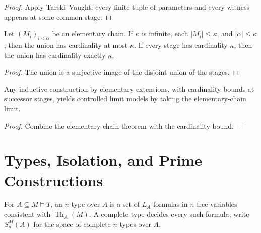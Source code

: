 \begin{proof}
Apply Tarski--Vaught: every finite tuple of parameters and every witness
appears at some common stage.
\end{proof}

\begin{lemma}
\label{lem:elementary-chain-cardinality}
\leanok
{}
Let \((M_i)_{i<\alpha}\) be an elementary chain.  If \(\kappa\) is
infinite, each \(|M_i|\leq\kappa\), and \(|\alpha|\leq\kappa\), then the
union has cardinality at most \(\kappa\).  If every stage has cardinality
\(\kappa\), then the union has cardinality exactly \(\kappa\).
\end{lemma}

\begin{proof}
The union is a surjective image of the disjoint union of the stages.
\end{proof}

\begin{theorem}
\label{thm:loewenheim-skolem-constructions}
\leanok
{}
Any inductive construction by elementary extensions, with cardinality
bounds at successor stages, yields controlled limit models by taking the
elementary-chain limit.
\end{theorem}

\begin{proof}
\leanok
{}
Combine the elementary-chain theorem with the cardinality bound.
\end{proof}

\section{Types, Isolation, and Prime Constructions}

\begin{definition}
\label{def:types-over-parameters}
\leanok
{}
For \(A\subseteq M\models T\), an \(n\)-type over \(A\) is a set of
\(L_A\)-formulas in \(n\) free variables consistent with
\(\operatorname{Th}_A(M)\).  A complete type decides every such formula;
write \(S_n^M(A)\) for the space of complete \(n\)-types over \(A\).
\end{definition}

